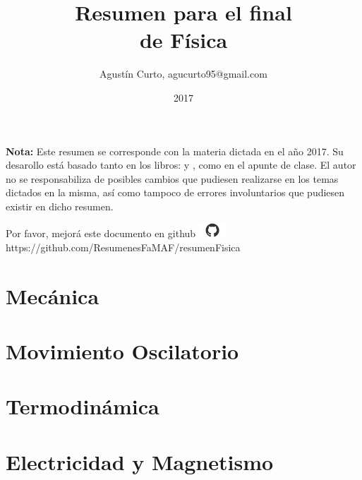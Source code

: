 \documentclass[12pt,a4paper]{article}
\author{Agustín Curto, agucurto95@gmail.com}
\title{Resumen para el final \\ de Física}
\date{2017}
\newcommand{\PN}{\par\noindent}
\begin{document}
	\clearpage\maketitle
	\thispagestyle{empty}
	\tableofcontents

	\vspace{5cm}
	\PN \textbf{Nota:} Este resumen se corresponde con la materia dictada en el año 2017. Su desarollo está basado tanto
	en los libros: \cite{1} y \cite{2}, como en el apunte de clase. El autor no se responsabiliza de posibles cambios que
	pudiesen realizarse en los temas dictados en la misma, así como tampoco de errores involuntarios que pudiesen existir
	en dicho resumen.

	
	

	\vspace{\fill}
	\begin{center}
		Por favor, mejorá este documento en github
		\includegraphics[width=1cm]{graphics/github.png} \\
		https://github.com/ResumenesFaMAF/resumenFisica
	\end{center}

	\pagebreak

	\part{Mecánica}
		
		
		
		
		
		
		
		
		
		
		
		
		

	\part{Movimiento Oscilatorio}
		
		
		
		
		

	\part{Termodinámica}
		
		
		
		
		
		
		
		
		

	\part{Electricidad y Magnetismo}
		
		
		
		
		
		
\end{document}
